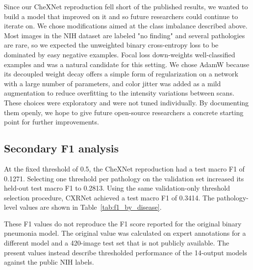 Since our CheXNet reproduction fell short of the published results, we
wanted to build a model that improved on it and so future researchers
could continue to iterate on. We chose modifications aimed at the class
imbalance described above. Most images in the NIH dataset are labeled "no finding" 
and several pathologies are rare, so we expected the unweighted binary cross-entropy
loss to be dominated by easy negative examples. Focal loss down-weights
well-classified examples and was a natural candidate for this setting. We
chose AdamW because its decoupled weight decay offers a simple form of
regularization on a network with a large number of parameters, and color
jitter was added as a mild augmentation to reduce overfitting to the
intensity variations between scans. These choices were exploratory and
were not tuned individually. By documenting them openly, we hope to give
future open-source researchers a concrete starting point for further
improvements.

\subsection{Secondary F1 analysis}

At the fixed threshold of 0.5, the CheXNet reproduction had a test macro F1 of
0.1271. Selecting one threshold per pathology on the validation set increased
its held-out test macro F1 to 0.2813. Using the same validation-only threshold
selection procedure, CXRNet achieved a test macro F1 of 0.3414. The
pathology-level values are shown in Table~\ref{tab:f1_by_disease}.

These F1 values do not reproduce the F1 score reported for the original binary
pneumonia model. The original value was calculated on expert annotations for a
different model and a 420-image test set that is not publicly available. The
present values instead describe thresholded performance of the 14-output
models against the public NIH labels.


